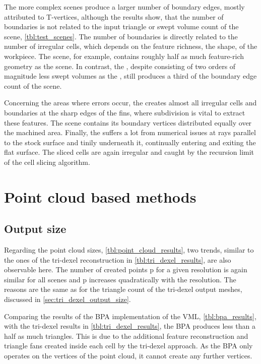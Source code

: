The more complex scenes produce a larger number of boundary edges, mostly attributed to T-vertices, although the results show, that the number of boundaries is not related to the input triangle or swept volume count of the scene, \cf \cref{tbl:test_scenes}.
The number of boundaries is directly related to the number of irregular cells, which depends on the feature richness, \ie the shape, of the workpiece.
The \impellerhalf scene, for example, contains roughly half as much feature-rich geometry as the \impeller scene.
In contrast, the \cylinderhead, despite consisting of two orders of magnitude less swept volumes as the \impeller, still produces a third of the boundary edge count of the \impeller scene.

Concerning the areas where errors occur, the \cylinderhead creates almost all irregular cells and boundaries at the sharp edges of the fins, where subdivision is vital to extract these features.
The \impeller scene contains its boundary vertices distributed equally over the machined area.
Finally, the \turbine suffers a lot from numerical issues at rays parallel to the stock surface and tinily underneath it, continually entering and exiting the flat surface.
The sliced cells are again irregular and caught by the recursion limit of the cell slicing algorithm.


\section{Point cloud based methods}
\label{sec:point_cloud_discussion}


\subsection {Output size}

Regarding the point cloud sizes, \cf \cref{tbl:point_cloud_results}, two trends, similar to the ones of the tri-dexel reconstruction in \cref{tbl:tri_dexel_results}, are also observable here.
The number of created points p for a given resolution is again similar for all scenes and  p increases quadratically with the resolution.
The reasons are the same as for the triangle count of the tri-dexel output meshes, discussed in \cref{sec:tri_dexel_output_size}.

Comparing the results of the BPA implementation of the VML, \cf \cref{tbl:bpa_results}, with the tri-dexel results in \cref{tbl:tri_dexel_results}, the BPA produces less than a half as much triangles.
This is due to the additional feature reconstruction and triangle fans created inside each cell by the tri-dexel approach.
As the BPA only operates on the vertices of the point cloud, it cannot create any further vertices.

